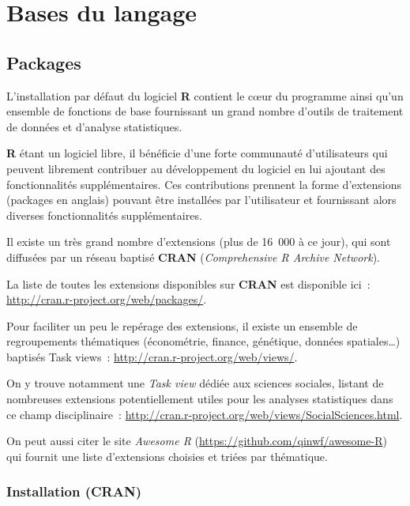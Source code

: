\documentclass[
  letterpaper,
  DIV=11,
  numbers=noendperiod,
  oneside]{scrreprt}
\begin{document}
\part{\textbf{Bases du langage}}

\hypertarget{sec-packages}{%
\chapter{Packages}\label{sec-packages}}

L'installation par défaut du logiciel \textbf{R} contient le cœur du
programme ainsi qu'un ensemble de fonctions de base fournissant un grand
nombre d'outils de traitement de données et d'analyse statistiques.

\textbf{R} étant un logiciel libre, il bénéficie d'une forte communauté
d'utilisateurs qui peuvent librement contribuer au développement du
logiciel en lui ajoutant des fonctionnalités supplémentaires. Ces
contributions prennent la forme d'extensions (packages en anglais)
pouvant être installées par l'utilisateur et fournissant alors diverses
fonctionnalités supplémentaires.

Il existe un très grand nombre d'extensions (plus de 16~000 à ce jour),
qui sont diffusées par un réseau baptisé \textbf{CRAN}
(\emph{Comprehensive R Archive Network}).

La liste de toutes les extensions disponibles sur \textbf{CRAN} est
disponible ici~: \url{http://cran.r-project.org/web/packages/}.

Pour faciliter un peu le repérage des extensions, il existe un ensemble
de regroupements thématiques (économétrie, finance, génétique, données
spatiales\ldots) baptisés Task views~:
\url{http://cran.r-project.org/web/views/}.

On y trouve notamment une \emph{Task view} dédiée aux sciences sociales,
listant de nombreuses extensions potentiellement utiles pour les
analyses statistiques dans ce champ disciplinaire~:
\url{http://cran.r-project.org/web/views/SocialSciences.html}.

On peut aussi citer le site \emph{Awesome R}
(\url{https://github.com/qinwf/awesome-R}) qui fournit une liste
d'extensions choisies et triées par thématique.

\hypertarget{installation-cran}{%
\section{Installation (CRAN)}\label{installation-cran}}
\end{document}
